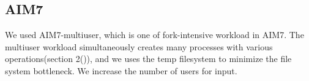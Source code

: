 \subsection{AIM7}



We used AIM7-multiuser, which is one of fork-intensive workload in AIM7.
The multiuser workload simultaneously creates many processes with various
operations(section 2()), and we uses the temp filesystem to minimize the file
system bottleneck.
We increase the number of users for input.
 
